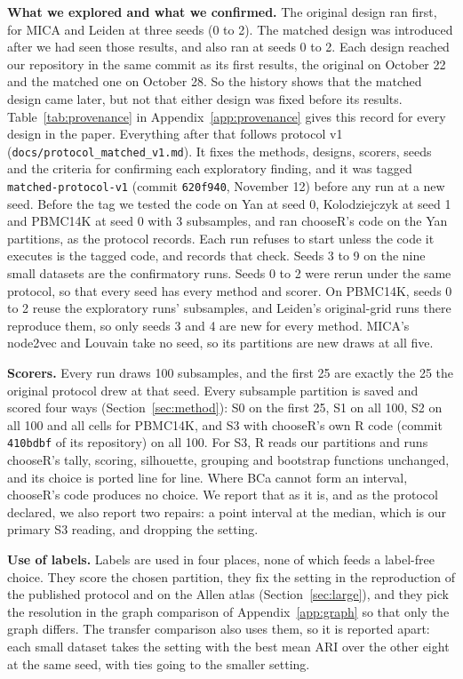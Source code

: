 \textbf{What we explored and what we confirmed.} The original design ran first, for MICA and Leiden at
three seeds (0 to 2). The matched design was introduced after we had seen those results, and also ran
at seeds 0 to 2. Each design reached our repository in the same commit as its first results, the original on October 22 and the matched one on October 28. So the history shows that the matched design came later, but not that either design was fixed before its results. Table~\ref{tab:provenance} in
Appendix~\ref{app:provenance} gives this record for every design in the paper. Everything after that follows protocol v1
(\texttt{docs/protocol\_matched\_v1.md}). It fixes the methods, designs, scorers, seeds and the criteria
for confirming each exploratory finding, and it was tagged \texttt{matched-protocol-v1}
(commit \texttt{620f940}, November 12) before any run at a new seed. Before the tag we tested the code on Yan at seed 0, Kolodziejczyk at seed 1 and PBMC14K at seed 0 with 3 subsamples, and ran chooseR's code on the Yan partitions, as the protocol records. Each run refuses to start unless
the code it executes is the tagged code, and records that check. Seeds 3 to 9 on the nine small datasets
are the confirmatory runs. Seeds 0 to 2 were rerun under the same protocol, so that every seed has every
method and scorer. On PBMC14K, seeds 0 to 2 reuse the exploratory runs' subsamples, and Leiden's original-grid runs there reproduce them, so only seeds 3 and 4 are new for every method. MICA's node2vec and Louvain take no seed, so its partitions are new draws at all five.

\textbf{Scorers.} Every run draws 100 subsamples, and the first 25 are exactly the 25 the original
protocol drew at that seed. Every subsample partition is saved and scored four ways (Section~\ref{sec:method}):
S0 on the first 25, S1 on all 100, S2 on all 100 and all cells for PBMC14K, and S3 with chooseR's own R
code (commit \texttt{410bdbf} of its repository) on all 100. For S3, R reads our partitions and runs
chooseR's tally, scoring, silhouette, grouping and bootstrap functions unchanged, and its choice is
ported line for line. Where BCa cannot form an interval, chooseR's code produces no choice. We report
that as it is, and as the protocol declared, we also report two repairs: a point interval at the
median, which is our primary S3 reading, and dropping the setting.

\textbf{Use of labels.}\label{sec:labeluse} Labels are used in four places, none of which feeds a
label-free choice. They score the chosen partition, they fix the setting in the reproduction of the
published protocol and on the Allen atlas (Section~\ref{sec:large}), and they pick the resolution in the graph comparison of
Appendix~\ref{app:graph} so that only the graph differs. The transfer comparison also uses them, so it
is reported apart: each small dataset takes the setting with the best mean ARI over the other eight at
the same seed, with ties going to the smaller setting.

